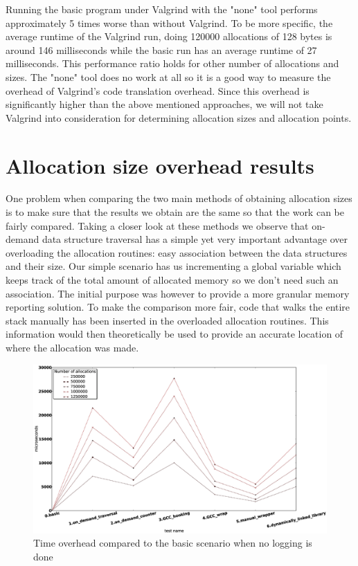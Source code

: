 Running the basic program under Valgrind with the "none" tool performs approximately 5 times worse than without Valgrind. To be more specific, the average runtime of the Valgrind run, doing 120000 allocations of 128 bytes is around 146 milliseconds while the basic run has an average runtime of 27 milliseconds. This performance ratio holds for other number of allocations and sizes. The "none" tool does no work at all so it is a good way to measure the overhead of Valgrind's code translation overhead. Since this overhead is significantly higher than the above mentioned approaches, we will not take Valgrind into consideration for determining allocation sizes and allocation points.

\section{Allocation size overhead results}
\label{section:allocsz}

One problem when comparing the two main methods of obtaining allocation sizes is to make sure that the results we obtain are the same so that the work can be fairly compared. Taking a closer look at these methods we observe that on-demand data structure traversal has a simple yet very important advantage over overloading the allocation routines: easy association between the data structures and their size. Our simple scenario has us incrementing a global variable which keeps track of the total amount of allocated memory so we don't need such an association. The initial purpose was however to provide a more granular memory reporting solution. To make the comparison more fair, code that walks the entire stack manually has been inserted in the overloaded allocation routines. This information would then theoretically be used to provide an accurate location of where the allocation was made.

\begin{figure}[htb]
\centering
\includegraphics[width=1.0\textwidth]{src/img/allocationsizewithoutlogging}
\caption{Time overhead compared to the basic scenario when no logging is done}
\label{fig:allocszwithoutlog}
\end{figure}

